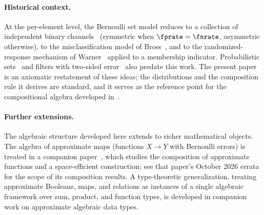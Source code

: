 \paragraph{Historical context.}
At the per-element level, the Bernoulli set model reduces to a collection of independent binary channels~\cite{shannonBSC} (symmetric when $\fprate = \fnrate$, asymmetric otherwise), to the misclassification model of Bross~\cite{bross1954misclassification}, and to the randomized-response mechanism of Warner~\cite{warner1965} applied to a membership indicator.
Probabilistic sets~\cite{hirota1981probabilistic} and filters with two-sided error~\cite{donnet2006retouched,laufer2011generalized} also predate this work.
The present paper is an axiomatic restatement of these ideas; the distributions and the composition rule it derives are standard, and it serves as the reference point for the compositional algebra developed in~\cite{bernoulliComposition}.

\paragraph{Further extensions.}
The algebraic structure developed here extends to richer mathematical objects.
The algebra of approximate maps (functions $X \to Y$ with Bernoulli errors) is treated in a companion paper~\cite{bernoulliMaps}, which studies the composition of approximate functions and a space-efficient construction; see that paper's October 2026 errata for the scope of its composition results.
A type-theoretic generalization, treating approximate Booleans, maps, and relations as instances of a single algebraic framework over sum, product, and function types, is developed in companion work on approximate algebraic data types.
